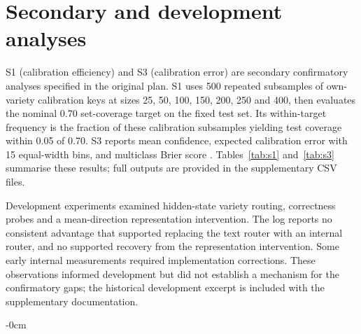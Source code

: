 \documentclass[applsci,article,submit,pdftex,oneauthor]{Definitions/mdpi}
\begin{document}
\FloatBarrier
\section{Secondary and development analyses}\label{development-phase-experiments}

S1 (calibration efficiency) and S3 (calibration error) are secondary confirmatory analyses specified in the original plan. S1 uses 500 repeated subsamples of own-variety calibration keys at sizes 25, 50, 100, 150, 200, 250 and 400, then evaluates the nominal 0.70 set-coverage target on the fixed test set. Its within-target frequency is the fraction of these calibration subsamples yielding test coverage within 0.05 of 0.70. S3 reports mean confidence, expected calibration error with 15 equal-width bins, and multiclass Brier score \cite{guo2017calibration}. Tables~\ref{tab:s1} and~\ref{tab:s3} summarise these results; full outputs are provided in the supplementary CSV files.





Development experiments examined hidden-state variety routing, correctness probes and a mean-direction representation intervention. The log reports no consistent advantage that supported replacing the text router with an internal router, and no supported recovery from the representation intervention. Some early internal measurements required implementation corrections. These observations informed development but did not establish a mechanism for the confirmatory gaps; the historical development excerpt is included with the supplementary documentation.

\FloatBarrier
\begin{adjustwidth}{-\extralength}{0cm}

\PublishersNote{}
\end{adjustwidth}
\end{document}
